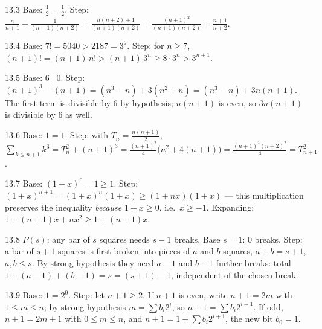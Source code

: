 \begin{solution}{13.3}
Base: $\frac{1}{2} = \frac{1}{2}$. Step:
$\frac{n}{n+1} + \frac{1}{(n+1)(n+2)}
= \frac{n(n+2) + 1}{(n+1)(n+2)}
= \frac{(n+1)^2}{(n+1)(n+2)} = \frac{n+1}{n+2}$.
\end{solution}

\begin{solution}{13.4}
Base: $7! = 5040 > 2187 = 3^7$. Step: for $n \geq 7$,
$(n+1)! = (n+1)\,n! > (n+1)\,3^{n} \geq 8 \cdot 3^{n} > 3^{n+1}$.
\end{solution}

\begin{solution}{13.5}
Base: $6 \mid 0$. Step:
$(n+1)^3 - (n+1) = (n^3 - n) + 3(n^2 + n) = (n^3 - n) + 3n(n+1)$.
The first term is divisible by $6$ by hypothesis; $n(n+1)$ is even, so
$3n(n+1)$ is divisible by $6$ as well.
\end{solution}

\begin{solution}{13.6}
Base: $1 = 1$. Step: with $T_n = \frac{n(n+1)}{2}$,
$\sum_{k\le n+1} k^3 = T_n^2 + (n+1)^3
= \frac{(n+1)^2}{4}\bigl(n^2 + 4(n+1)\bigr)
= \frac{(n+1)^2 (n+2)^2}{4} = T_{n+1}^2$.
\end{solution}

\begin{solution}{13.7}
Base: $(1+x)^0 = 1 \geq 1$. Step:
$(1+x)^{n+1} = (1+x)^{n}(1+x) \geq (1 + nx)(1 + x)$ --- this multiplication
preserves the inequality \emph{because} $1 + x \geq 0$, i.e.\ $x \geq -1$.
Expanding: $1 + (n+1)x + nx^{2} \geq 1 + (n+1)x$.
\end{solution}

\begin{solution}{13.8}
$P(s)$: any bar of $s$ squares needs $s - 1$ breaks. Base $s = 1$: $0$
breaks. Step: a bar of $s + 1$ squares is first broken into pieces of $a$
and $b$ squares, $a + b = s + 1$, $a, b \le s$. By strong hypothesis they
need $a - 1$ and $b - 1$ further breaks: total
$1 + (a-1) + (b-1) = s = (s+1) - 1$, independent of the chosen break.
\end{solution}

\begin{solution}{13.9}
Base: $1 = 2^0$. Step: let $n + 1 \geq 2$. If $n + 1$ is even, write
$n + 1 = 2m$ with $1 \le m \le n$; by strong hypothesis
$m = \sum b_i 2^{i}$, so $n + 1 = \sum b_i 2^{i+1}$. If odd,
$n + 1 = 2m + 1$ with $0 \le m \le n$, and
$n + 1 = 1 + \sum b_i 2^{i+1}$, the new bit $b_0 = 1$.
\end{solution}

